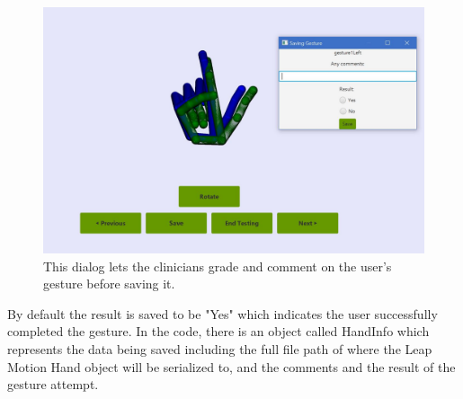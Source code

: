 \begin{figure}[H]
\centering
\includegraphics[scale=0.35]{Figures/6_saveGestureDialog.JPG}
\caption[Save Gesture Dialog]{This dialog lets the clinicians grade and comment on the user's gesture before saving it.}
\label{fig:saveGestureDialog}
\end{figure}
By default the result is saved to be "Yes" which indicates the user successfully completed the gesture. In the code, there is an object called HandInfo which represents the data being saved including the full file path of where the Leap Motion Hand object will be serialized to, and the comments and the result of the gesture attempt. 

